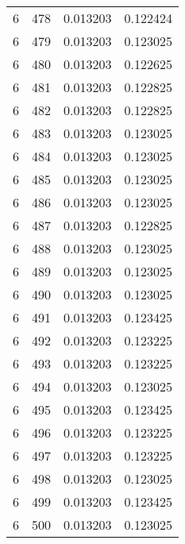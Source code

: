 \begin{longtable}{rrrr}
6 & 478 & 0.013203 & 0.122424 \\
6 & 479 & 0.013203 & 0.123025 \\
6 & 480 & 0.013203 & 0.122625 \\
6 & 481 & 0.013203 & 0.122825 \\
6 & 482 & 0.013203 & 0.122825 \\
6 & 483 & 0.013203 & 0.123025 \\
6 & 484 & 0.013203 & 0.123025 \\
6 & 485 & 0.013203 & 0.123025 \\
6 & 486 & 0.013203 & 0.123025 \\
6 & 487 & 0.013203 & 0.122825 \\
6 & 488 & 0.013203 & 0.123025 \\
6 & 489 & 0.013203 & 0.123025 \\
6 & 490 & 0.013203 & 0.123025 \\
6 & 491 & 0.013203 & 0.123425 \\
6 & 492 & 0.013203 & 0.123225 \\
6 & 493 & 0.013203 & 0.123225 \\
6 & 494 & 0.013203 & 0.123025 \\
6 & 495 & 0.013203 & 0.123425 \\
6 & 496 & 0.013203 & 0.123225 \\
6 & 497 & 0.013203 & 0.123225 \\
6 & 498 & 0.013203 & 0.123025 \\
6 & 499 & 0.013203 & 0.123425 \\
6 & 500 & 0.013203 & 0.123025 \\
\end{longtable}
